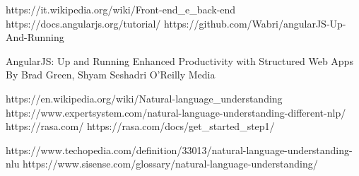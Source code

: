 \begin{thebibliography}{99}

https://it.wikipedia.org/wiki/Front-end_e_back-end
https://docs.angularjs.org/tutorial/
https://github.com/Wabri/angularJS-Up-And-Running

AngularJS: Up and Running
Enhanced Productivity with Structured Web Apps
By Brad Green, Shyam Seshadri 
O'Reilly Media

https://en.wikipedia.org/wiki/Natural-language_understanding
https://www.expertsystem.com/natural-language-understanding-different-nlp/
https://rasa.com/
https://rasa.com/docs/get_started_step1/


https://www.techopedia.com/definition/33013/natural-language-understanding-nlu
https://www.sisense.com/glossary/natural-language-understanding/



\end{thebibliography}
